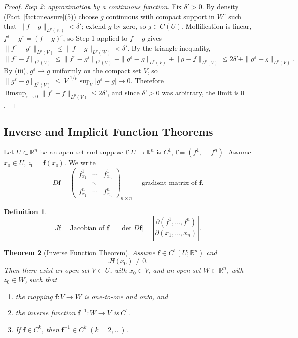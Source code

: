 \documentclass[11pt]{article}
\theoremstyle{plain}
\newtheorem{theorem}{Theorem}[section]
\theoremstyle{definition}
\newtheorem{definition}[theorem]{Definition}
\theoremstyle{remark}
\begin{document}
\begin{proof}
\emph{Step 2: approximation by a continuous function.} Fix $\delta' > 0$. By density (Fact~\ref{fact:measure}(5)) choose $g$ continuous with compact support in $W^\circ$ such that $\|f - g\|_{L^p(W)} < \delta'$; extend $g$ by zero, so $g \in C(U)$. Mollification is linear, $f^\varepsilon - g^\varepsilon = (f-g)^\varepsilon$, so Step 1 applied to $f - g$ gives $\|f^\varepsilon - g^\varepsilon\|_{L^p(V)} \leq \|f - g\|_{L^p(W)} < \delta'$. By the triangle inequality,
$$ \|f^\varepsilon - f\|_{L^p(V)} \leq \|f^\varepsilon - g^\varepsilon\|_{L^p(V)} + \|g^\varepsilon - g\|_{L^p(V)} + \|g - f\|_{L^p(V)} \leq 2\delta' + \|g^\varepsilon - g\|_{L^p(V)}. $$
By (iii), $g^\varepsilon \to g$ uniformly on the compact set $\bar V$, so $\|g^\varepsilon - g\|_{L^p(V)} \leq |V|^{1/p}\sup_V|g^\varepsilon - g| \to 0$. Therefore $\limsup_{\varepsilon\to 0}\|f^\varepsilon - f\|_{L^p(V)} \le 2\delta'$, and since $\delta' > 0$ was arbitrary, the limit is $0$.
\end{proof}

\subsection{Inverse and Implicit Function Theorems}\label{ssec:ift}

Let $U \subset \mathbb{R}^n$ be an open set and suppose $\mathbf{f} : U \to \mathbb{R}^n$ is $C^1$, $\mathbf{f} = (f^1, \dots, f^n)$. Assume $x_0 \in U$, $z_0 = \mathbf{f}(x_0)$. We write
$$ D\mathbf{f} = \begin{pmatrix} f^1_{x_1} & \cdots & f^1_{x_n} \\ & \ddots & \\ f^n_{x_1} & \cdots & f^n_{x_n} \end{pmatrix}_{n \times n} = \text{gradient matrix of } \mathbf{f}. $$

\begin{definition}
$$ J\mathbf{f} = \text{Jacobian of } \mathbf{f} = |\det D\mathbf{f}| = \left| \frac{\partial(f^1, \dots, f^n)}{\partial(x_1, \dots, x_n)} \right|. $$
\end{definition}

\begin{theorem}[Inverse Function Theorem]\label{thm:inverse}
Assume $\mathbf{f} \in C^1(U;\mathbb{R}^n)$ and
$$ J\mathbf{f}(x_0) \neq 0. $$
Then there exist an open set $V \subset U$, with $x_0 \in V$, and an open set $W \subset \mathbb{R}^n$, with $z_0 \in W$, such that
\begin{enumerate}
    \item[(i)] the mapping $\mathbf{f} : V \to W$ is one-to-one and onto, and
    \item[(ii)] the inverse function $\mathbf{f}^{-1} : W \to V$ is $C^1$.
    \item[(iii)] If $\mathbf{f} \in C^k$, then $\mathbf{f}^{-1} \in C^k$ $(k = 2, \dots)$.
\end{enumerate}
\end{theorem}
\end{document}
